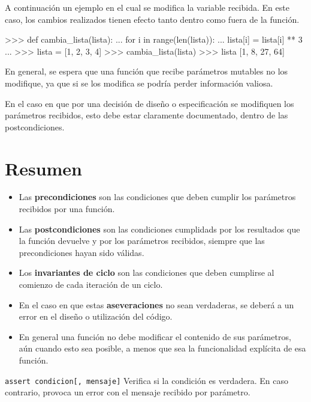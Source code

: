 A continuación un ejemplo en el cual se modifica la variable recibida. En este
caso, los cambios realizados tienen efecto tanto dentro como fuera de la
función.

\begin{codigo-python-sn}
>>> def cambia_lista(lista):
...     for i in range(len(lista)):
...         lista[i] = lista[i] ** 3
...
>>> lista = [1, 2, 3, 4]
>>> cambia_lista(lista)
>>> lista
[1, 8, 27, 64]
\end{codigo-python-sn}

\begin{atencion}
En general, se espera que una función que recibe parámetros mutables no los
modifique, ya que si se los modifica se podría perder información valiosa.

En el caso en que por una decisión de diseño o especificación se modifiquen
los parámetros recibidos, esto debe estar claramente documentado, dentro de
las postcondiciones.
\end{atencion}

\section{Resumen}

\begin{itemize}
\item Las \textbf{precondiciones} son las condiciones que deben cumplir los
parámetros recibidos por una función.
\item Las \textbf{postcondiciones} son las condiciones cumplidads por los
resultados que la función devuelve y por los parámetros recibidos, siempre
que las precondiciones hayan sido válidas.
\item Los \textbf{invariantes de ciclo} son las condiciones que deben
cumplirse al comienzo de cada iteración de un ciclo.
\item En el caso en que estas \textbf{aseveraciones} no sean verdaderas, se
deberá a un error en el diseño o utilización del código.
\item En general una función no debe modificar el contenido de sus parámetros,
aún cuando esto sea posible, a menos que sea la funcionalidad explícita de esa
función.
\end{itemize}

\begin{referencia_python}

\begin{sintaxis}{\lstinline!assert condicion[, mensaje]!}
Verifica si la condición es verdadera.  En caso contrario, provoca un error
con el mensaje recibido por parámetro.
\end{sintaxis}

\end{referencia_python}

